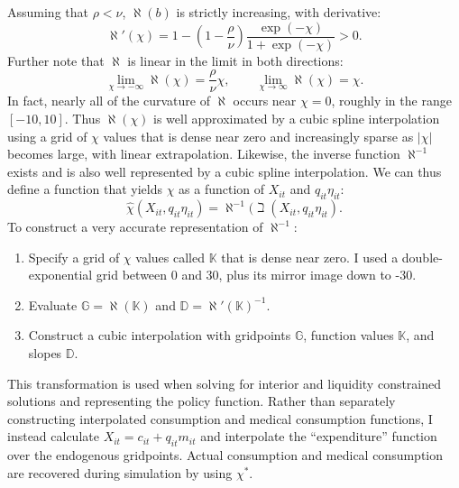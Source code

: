 \documentclass[12pt,pdftex,letterpaper]{article}
\newcommand{\Con}{c}
\newcommand{\Care}{m}
\newcommand{\Xpend}{X}
\newcommand{\Copay}{q}
\newcommand{\CRRAcon}{\rho}
\newcommand{\CRRAcare}{\nu}
\newcommand{\MedShk}{\eta}
\begin{document}
Assuming that $\rho < \nu$, $\aleph(b)$ is strictly increasing, with derivative:
\begin{equation}
\aleph'(\chi) = 1 - \left(1-\frac{\CRRAcon}{\CRRAcare}\right)  \frac{\exp(-\chi)}{1 + \exp(-\chi)} > 0.
\end{equation}
Further note that $\aleph$ is linear in the limit in both directions:
\begin{equation}
\lim_{\chi \rightarrow -\infty} \aleph(\chi) = \frac{\CRRAcon}{\CRRAcare} \chi, \qquad \lim_{\chi \rightarrow \infty} \aleph(\chi) = \chi.
\end{equation}
In fact, nearly all of the curvature of $\aleph$ occurs near $\chi=0$, roughly in the range $[-10,10]$.  Thus $\aleph(\chi)$ is well approximated by a cubic spline interpolation using a grid of $\chi$ values that is dense near zero and increasingly sparse as $|\chi|$ becomes large, with linear extrapolation.  Likewise, the inverse function $\aleph^{-1}$ exists and is also well represented by a cubic spline interpolation.  We can thus define a function that yields $\chi$ as a function of $\Xpend_{it}$ and $\Copay_{it} \MedShk_{it}$:
\begin{equation}\label{OptCshare}
\hat{\chi}(\Xpend_{it}, \Copay_{it} \MedShk_{it}) = \aleph^{-1}(\beth(\Xpend_{it}, \Copay_{it} \MedShk_{it}).
\end{equation}
To construct a very accurate representation of $\aleph^{-1}$:
\begin{enumerate}
\item Specify a grid of $\chi$ values called $\mathbb{K}$ that is dense near zero.  I used a double-exponential grid between 0 and 30, plus its mirror image down to -30.

\item Evaluate $\mathbb{G} = \aleph(\mathbb{K})$ and $\mathbb{D} = \aleph'(\mathbb{K})^{-1}$.

\item Construct a cubic interpolation with gridpoints $\mathbb{G}$, function values $\mathbb{K}$, and slopes $\mathbb{D}$.
\end{enumerate}

This transformation is used when solving for interior and liquidity constrained solutions and representing the policy function.  Rather than separately constructing interpolated consumption and medical consumption functions, I instead calculate $\Xpend_{it} = \Con_{it} + \Copay_{it} \Care_{it}$ and interpolate the ``expenditure'' function over the endogenous gridpoints.  Actual consumption and medical consumption are recovered during simulation by using $\chi^*$.
\end{document}
